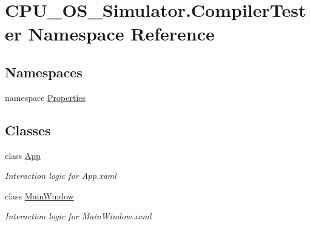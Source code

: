 \hypertarget{namespace_c_p_u___o_s___simulator_1_1_compiler_tester}{}\section{C\+P\+U\+\_\+\+O\+S\+\_\+\+Simulator.\+Compiler\+Tester Namespace Reference}
\label{namespace_c_p_u___o_s___simulator_1_1_compiler_tester}
\subsection*{Namespaces}
\begin{DoxyCompactItemize}
\item 
namespace \hyperlink{namespace_c_p_u___o_s___simulator_1_1_compiler_tester_1_1_properties}{Properties}
\end{DoxyCompactItemize}
\subsection*{Classes}
\begin{DoxyCompactItemize}
\item 
class \hyperlink{class_c_p_u___o_s___simulator_1_1_compiler_tester_1_1_app}{App}
\begin{DoxyCompactList}\small\item\em Interaction logic for App.\+xaml \end{DoxyCompactList}\item 
class \hyperlink{class_c_p_u___o_s___simulator_1_1_compiler_tester_1_1_main_window}{Main\+Window}
\begin{DoxyCompactList}\small\item\em Interaction logic for Main\+Window.\+xaml \end{DoxyCompactList}\end{DoxyCompactItemize}
